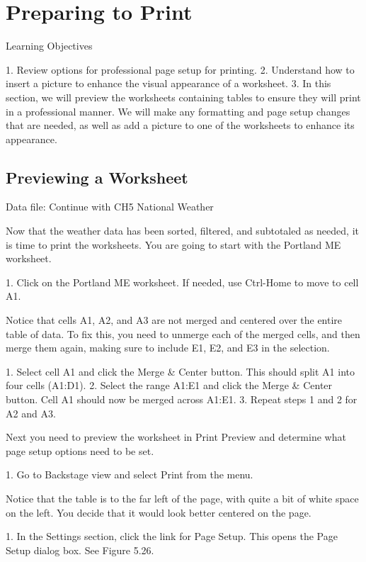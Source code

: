 \section{Preparing to Print}




Learning Objectives


1. Review options for professional page setup for printing.
2. Understand how to insert a picture to enhance the visual appearance of a worksheet.
3. In this section, we will preview the worksheets containing tables to ensure they will print in a professional
manner. We will make any formatting and page setup changes that are needed, as well as add a picture to
one of the worksheets to enhance its appearance.



\subsection{Previewing a Worksheet}

Data file: Continue with CH5 National Weather

Now that the weather data has been sorted, filtered, and subtotaled as needed, it is time to print the
worksheets. You are going to start with the Portland ME worksheet.

1. Click on the Portland ME worksheet. If needed, use Ctrl-Home to move to cell A1.

Notice that cells A1, A2, and A3 are not merged and centered over the entire table of data. To fix this,
you need to unmerge each of the merged cells, and then merge them again, making sure to include E1,
E2, and E3 in the selection.

1. Select cell A1 and click the Merge \& Center button. This should split A1 into four cells (A1:D1).
2. Select the range A1:E1 and click the Merge \& Center button. Cell A1 should now be merged
across A1:E1.
3. Repeat steps 1 and 2 for A2 and A3.

Next you need to preview the worksheet in Print Preview and determine what page setup options
need to be set.

1. Go to Backstage view and select Print from the menu.

Notice that the table is to the far left of the page, with quite a bit of white space on the left. You decide
that it would look better centered on the page.




1. In the Settings section, click the link for Page Setup. This opens the Page Setup dialog box. See
Figure 5.26.


